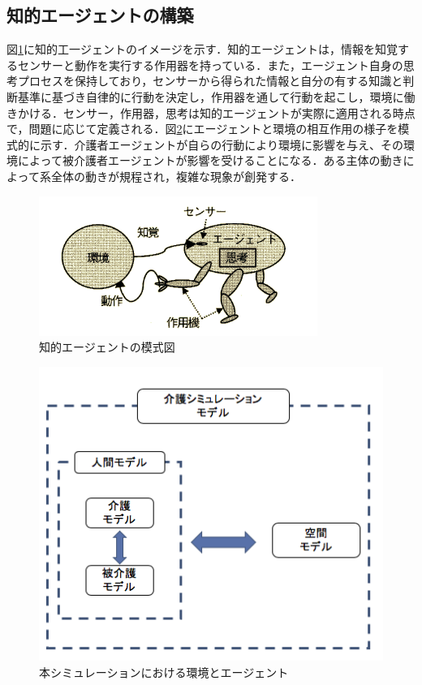 \subsection{知的エージェントの構築}
図\ref{intelligent_agent}に知的工一ジェントのイメージを示す．知的エージェントは，情報を知覚するセンサーと動作を実行する作用器を持っている．また，エージェント自身の思考プロセスを保持しており，センサーから得られた情報と自分の有する知識と判断基準に基づき自律的に行動を決定し，作用器を通して行動を起こし，環境に働きかける．センサー，作用器，思考は知的エージェントが実際に適用される時点で，問題に応じて定義される．図\ref{agent_modeling}にエージェントと環境の相互作用の様子を模式的に示す．介護者エージェントが自らの行動により環境に影響を与え、その環境によって被介護者エージェントが影響を受けることになる．ある主体の動きによって系全体の動きが規程され，複雑な現象が創発する．

\begin{figure}[htb]
\begin{center}
 \includegraphics[scale=1.0]{figures/intelligent_agent.png}
 \caption[知的エージェントの模式図]{知的エージェントの模式図 \label{intelligent_agent}}
\end{center}
\end{figure}

\begin{figure}[htb]
\begin{center}
 \includegraphics[scale=0.6]{figures/agent_modeling.png}
 \caption[本シミュレーションにおける環境とエージェント]{本シミュレーションにおける環境とエージェント \label{agent_modeling}}
\end{center}
\end{figure}

